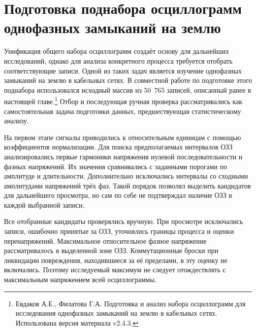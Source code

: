 \section{Подготовка поднабора осциллограмм однофазных замыканий на землю}
\label{sec:ch3_earth_fault_subset}

Унификация общего набора осциллограмм создаёт основу для дальнейших
исследований, однако для анализа конкретного процесса требуется отобрать
соответствующие записи. Одной из таких задач является изучение однофазных
замыканий на землю в кабельных сетях. В совместной работе по подготовке
этого поднабора использовался исходный массив из 50~765 записей,
описанный ранее в настоящей главе.\footnote{Евдаков А.Е., Филатова Г.А.
Подготовка и анализ набора осциллограмм для исследования однофазных
замыканий на землю в кабельных сетях. Использована версия материала v2.4.3.}
Отбор и последующая ручная проверка рассматривались как самостоятельная
задача подготовки данных, предшествующая статистическому анализу.

На первом этапе сигналы приводились к относительным единицам с помощью
коэффициентов нормализации. Для поиска предполагаемых интервалов ОЗЗ
анализировались первые гармоники напряжения нулевой последовательности
и фазных напряжений. Их значения сравнивались с заданными порогами
по амплитуде и длительности. Дополнительно исключались интервалы
со сходными амплитудами напряжений трёх фаз. Такой порядок позволял
выделить кандидатов для дальнейшего просмотра, но сам по себе
не подтверждал наличие ОЗЗ в каждой выбранной записи.

Все отобранные кандидаты проверялись вручную. При просмотре исключались
записи, ошибочно принятые за ОЗЗ, уточнялись границы процесса
и оценки перенапряжений. Максимальное относительное фазное напряжение
рассматривалось в выделенной зоне ОЗЗ. Коммутационные броски при
ликвидации повреждения, находившиеся за её пределами, в эту оценку
не включались. Поэтому исследуемый максимум не следует отождествлять
с максимальным напряжением всей осциллограммы.

